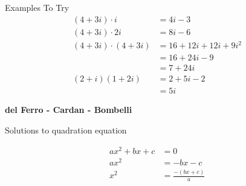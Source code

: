 \documentclass{article}
\begin{document}
Examples To Try
\begin{align*}
(4 + 3i)\cdot i &=  4i -3\\
(4 + 3i)\cdot 2i &=  8i -6\\
(4 + 3i)\cdot (4 + 3i) &=  16 + 12i + 12i + 9i^2\\
&= 16 + 24i -9\\
&= 7 + 24i\\
(2 + i)(1 + 2i) &= 2 + 5i -2\\
&= 5i
\end{align*} 


\textbf{del Ferro - Cardan - Bombelli}

Solutions to quadration equation

\begin{align*}
ax^2 + bx + c &= 0\\
ax^2 &= -bx - c\\
x^2 &= \frac{-(bx + c)}{a}
\end{align*}
\end{document}
